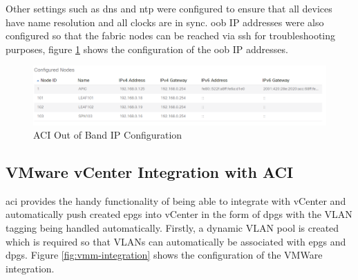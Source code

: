 Other settings such as \gls{dns} and \gls{ntp} were configured to ensure that
all devices have name resolution and all clocks are in sync.
\gls{oob} IP addresses were also configured so that the fabric nodes can be
reached via \gls{ssh} for troubleshooting purposes, figure \ref{fig:aci-oob-ip}
shows the configuration of the \gls{oob} IP addresses.

\begin{figure}[H]
    
    \centering
    \includegraphics[scale=0.5]{images/aci-oob-ip.png}
    
    \caption{ACI Out of Band IP Configuration}
    \label{fig:aci-oob-ip}
\end{figure}

\subsection{VMware vCenter Integration with ACI}
\gls{aci} provides the handy functionality of being able to integrate with
vCenter and automatically push created \gls{epg}s into vCenter in the form of
\gls{dpg}s with the VLAN tagging being handled automatically.
Firstly, a dynamic VLAN pool is created which is required so that VLANs can
automatically be associated with \gls{epg}s and \gls{dpg}s. Figure
\ref{fig:vmm-integration} shows the configuration of the VMWare integration.

